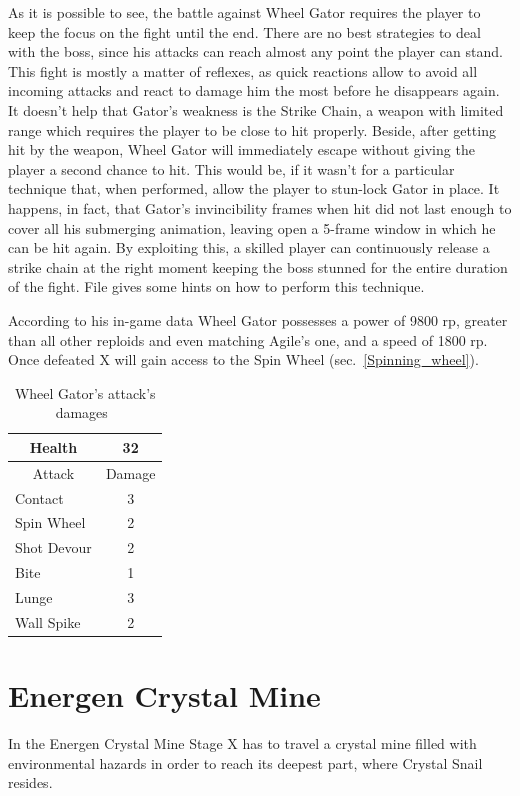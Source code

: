 As it is possible to see, the battle against Wheel Gator requires the player to keep the focus on the fight until the end. There are no best strategies to deal with the boss, since his attacks can reach almost any point the player can stand. This fight is mostly a matter of reflexes, as quick reactions allow to avoid all incoming attacks and react to damage him the most before he disappears again. It doesn't help that Gator's weakness is the Strike Chain, a weapon with limited range which requires the player to be close to hit properly. Beside, after getting hit by the weapon, Wheel Gator will immediately escape without giving the player a second chance to hit. This would be, if it wasn't for a particular technique that, when performed, allow the player to stun-lock Gator in place. It happens, in fact, that Gator's invincibility frames when hit did not last enough to cover all his submerging animation, leaving open a 5-frame window in which he can be hit again. By exploiting this, a skilled player can continuously release a strike chain at the right moment keeping the boss stunned for the entire duration of the fight. File  gives some hints on how to perform this technique.

According to his in-game data Wheel Gator possesses a power of 9800 rp, greater than all other reploids and even matching Agile's one, and a speed of 1800 rp. Once defeated X will gain access to the Spin Wheel (sec.~\ref{Spinning_wheel}).


\begin{table}[htp]
	\centering
	\begin{tabular}[h]{l c}
		\toprule
		\multicolumn{1}{c}{Health}  & 32 \\
		\midrule
		\multicolumn{1}{c}{Attack} & \multicolumn{1}{c}{Damage}\\
		Contact & 3 \\
		Spin Wheel & 2\\
		Shot Devour & 2\\
		Bite & 1\\
		Lunge& 3\\
		Wall Spike& 2\\
		\bottomrule
	\end{tabular}
	\caption{Wheel Gator's attack's damages~\cite{wiki:Wheel_gator}}
\end{table}

\section{Energen Crystal Mine}
In the Energen Crystal Mine Stage X has to travel a crystal mine filled with environmental hazards in order to reach its deepest part, where Crystal Snail resides.

